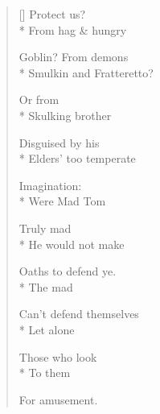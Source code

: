 \label{ch:lear_aq}
\settowidth{\versewidth}{Smulkin and Fratteretto?}
\begin{verse}[\versewidth]
 Protect us?\\*
From hag \& hungry

Goblin? From demons\\*
Smulkin and Fratteretto?

Or from\\*
Skulking brother

Disguised by his\\*
Elders' too temperate

Imagination:\\*
Were Mad Tom

Truly mad\\*
He would not make

Oaths to defend ye.\\*
The mad

Can't defend themselves\\*
Let alone

Those who look\\*
To them

For amusement.
\end{verse}
